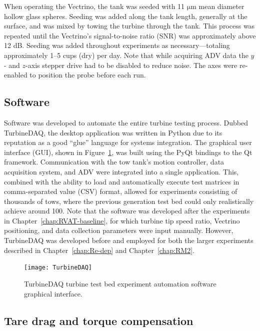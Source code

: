 When operating the Vectrino, the tank was seeded with 11 $\mathrm{\mu}$m mean
diameter hollow glass spheres. Seeding was added along the tank length,
generally at the surface, and was mixed by towing the turbine through the tank.
This process was repeated until the Vectrino's signal-to-noise ratio (SNR) was
approximately above 12 dB. Seeding was added throughout experiments as
necessary---totaling approximately 1--5 cups (dry) per day. Note that while
acquiring ADV data the $y$- and $z$-axis stepper drive had to be disabled to
reduce noise. The axes were re-enabled to position the probe before each run.


\subsection{Software}

Software was developed to automate the entire turbine testing process. Dubbed
TurbineDAQ, the desktop application was written in Python due to its reputation
as a good ``glue'' language for systems integration. The graphical user
interface (GUI), shown in Figure~\ref{fig:TurbineDAQ}, was built using the PyQt
bindings to the Qt framework. Communication with the tow tank's motion
controller, data acquisition system, and ADV were integrated into a single
application. This, combined with the ability to load and automatically execute
test matrices in comma-separated value (CSV) format, allowed for experiments
consisting of thousands of tows, where the previous generation test bed could
only realistically achieve around 100. Note that the software was developed
after the experiments in Chapter~\ref{chap:RVAT-baseline}, for which turbine tip
speed ratio, Vectrino positioning, and data collection parameters were input
manually. However, TurbineDAQ was developed before and employed for both the
larger experiments described in Chapter~\ref{chap:Re-dep} and
Chapter~\ref{chap:RM2}.

\begin{figure}
    \centering

    \texttt{[image: TurbineDAQ]}

    \caption{TurbineDAQ turbine test bed experiment automation software
    graphical interface.}

    \label{fig:TurbineDAQ}
\end{figure}


\subsection{Tare drag and torque compensation}


